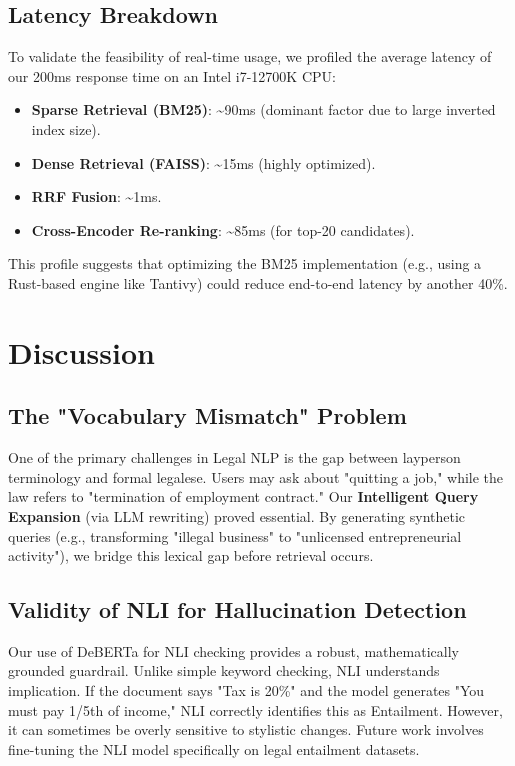 \documentclass[11pt]{article}
\begin{document}
\subsection{Latency Breakdown}
To validate the feasibility of real-time usage, we profiled the average latency of our 200ms response time on an Intel i7-12700K CPU:
\begin{itemize}
    \item \textbf{Sparse Retrieval (BM25)}: \textasciitilde90ms (dominant factor due to large inverted index size).
    \item \textbf{Dense Retrieval (FAISS)}: \textasciitilde15ms (highly optimized).
    \item \textbf{RRF Fusion}: \textasciitilde1ms.
    \item \textbf{Cross-Encoder Re-ranking}: \textasciitilde85ms (for top-20 candidates).
\end{itemize}
This profile suggests that optimizing the BM25 implementation (e.g., using a Rust-based engine like Tantivy) could reduce end-to-end latency by another 40\%.

\section{Discussion}

\subsection{The "Vocabulary Mismatch" Problem}
One of the primary challenges in Legal NLP is the gap between layperson terminology and formal legalese. Users may ask about "quitting a job," while the law refers to "termination of employment contract."
Our \textbf{Intelligent Query Expansion} (via LLM rewriting) proved essential. By generating synthetic queries (e.g., transforming "illegal business" to "unlicensed entrepreneurial activity"), we bridge this lexical gap before retrieval occurs.

\subsection{Validity of NLI for Hallucination Detection}
Our use of DeBERTa for NLI checking provides a robust, mathematically grounded guardrail. Unlike simple keyword checking, NLI understands implication. If the document says "Tax is 20\%" and the model generates "You must pay 1/5th of income," NLI correctly identifies this as Entailment. However, it can sometimes be overly sensitive to stylistic changes. Future work involves fine-tuning the NLI model specifically on legal entailment datasets.
\end{document}
